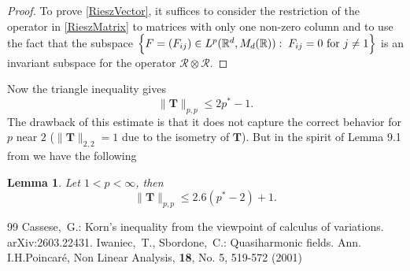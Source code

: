 \documentclass[10pt,a4paper]{amsart}
\newtheorem{lemma}{Lemma}
\newcommand{\R}{{\mathbb R}}
\newcommand{\RV}{{\mathcal R}}
\newcommand{\T}{{\mathbf T}}
\newcommand{\RO}{{\RV\otimes\RV}}
\begin{document}
\begin{proof}
To prove \eqref{RieszVector}, it suffices to consider the restriction of the operator in \eqref{RieszMatrix} to matrices with only one non-zero column and to use the fact that the subspace
$\Bigl\{F=(F_{ij}) \in L^p(\R^d,M_d(\R)):\;F_{ij}=0 \text{ for } j\neq 1\Bigr\}$
is an invariant subspace for the operator $\RO$.
\end{proof}

Now the triangle inequality gives
\begin{equation*}
\|\T\|_{p,p}\leq 2p^*-1.
\end{equation*}
The drawback of this estimate is that it does not capture the correct behavior for $p$ near $2$ ($\|\T\|_{2,2}=1$ due to the isometry of $\T$). But in the spirit of Lemma 9.1 from \cite{IS2001} we have the following
\begin{lemma}\label{InterpolLemma}
Let $1<p< \infty$, then
\begin{equation}\label{Interpol26}
\|\T\|_{p,p}\le 2.6(p^*-2)+1.
\end{equation}
\end{lemma}

\begin{thebibliography}{99}
 Cassese,~G.: \newblock Korn's inequality from the viewpoint of calculus of variations. \newblock arXiv:2603.22431.
 Iwaniec,~T., Sbordone,~C.: \newblock Quasiharmonic fields. \newblock Ann. I.H.Poincar\'e, Non Linear Analysis, \textbf{18}, No. 5, 519-572 (2001)
\end{thebibliography}
\end{document}
